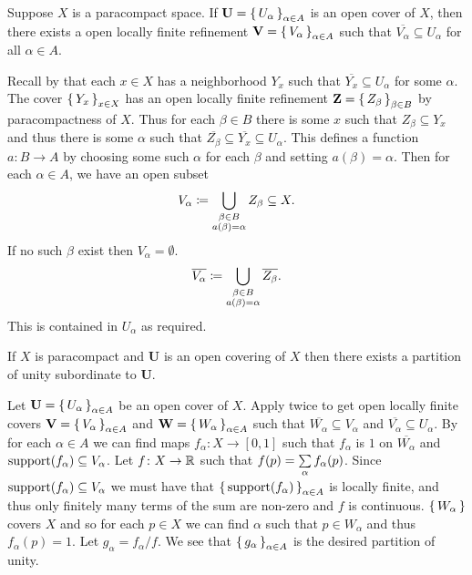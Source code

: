 \documentclass[letterpaper, 11pt, oneside]{book}
\begin{document}
\clearpage

\begin{lem}\label{lem: paracompact_refinement_closed_subset}
  Suppose $X$ is a paracompact space.
  If $\textbf{U} = \set{U_{\alpha}}_{\alpha \in A}$ is an open cover of $X$, then there exists a open locally finite refinement $\textbf{V} = \set{V_{\alpha}}_{\alpha \in A}$ such that $\overline{V_{\alpha}} \subseteq U_{\alpha}$ for all $\alpha \in A$.
\end{lem}
\begin{pf}
  Recall by  that each $x \in X$ has a neighborhood $Y_{x}$ such that $\overline{Y_{x}} \subseteq U_{\alpha}$ for some $\alpha$.
  The cover $\set{Y_{x}}_{x \in X}$ has an open locally finite refinement $\textbf{Z} = \set{Z_{\beta}}_{\beta \in B}$ by paracompactness of $X$.
  Thus for each $\beta \in B$ there is some $x$ such that $Z_{\beta} \subseteq Y_{x}$ and thus there is some $\alpha$ such that $\overline{Z_{\beta}} \subseteq \overline{Y_{x}} \subseteq U_{\alpha}$.
  This defines a function $a\colon B \to A$ by choosing some such $\alpha$ for each $\beta$ and setting $a(\beta) = \alpha$.
  Then for each $\alpha \in A$, we have an open subset
  \[
    V_{\alpha} \coloneqq \bigcup_{\substack{\beta \in B \\ a(\beta) = \alpha}} Z_{\beta} \subseteq X.
  \]
  If no such $\beta$ exist then $V_{\alpha} = \emptyset$.
  \[
    \overline{V_{\alpha}} \coloneqq \bigcup_{\substack{\beta \in B \\ a(\beta) = \alpha}} \overline{Z_{\beta}}.
  \]
  This is contained in $U_{\alpha}$ as required.
\end{pf}

\begin{thrm}
  If $X$ is paracompact and \textbf{U} is an open covering of $X$ then there exists a partition of unity subordinate to \textbf{U}.
\end{thrm}
\begin{pf}
  Let $\textbf{U} = \set{U_{\alpha}}_{\alpha \in A}$ be an open cover of $X$.
  Apply  twice to get open locally finite covers $\textbf{V} = \set{V_{\alpha}}_{\alpha \in A}$ and $\textbf{W} = \set{W_{\alpha}}_{\alpha \in A}$ such that $\overline{W_{\alpha}} \subseteq V_{\alpha}$ and $\overline{V_{\alpha}} \subseteq U_{\alpha}$.
  By  for each $\alpha \in A$ we can find maps $f_{\alpha}\colon X \to [0, 1]$ such that $f_{\alpha}$ is $1$ on $\overline{W_{\alpha}}$ and $\operatorname{support}(f_{\alpha}) \subseteq V_{\alpha}$.
  Let $f\colon X \to \mathbb{R}$ such that $f(p) = \sum\limits_{\alpha}f_{\alpha}(p)$.
  Since $\operatorname{support}(f_{\alpha}) \subseteq V_{\alpha}$ we must have that $\set{\operatorname{support}(f_{\alpha})}_{\alpha \in A}$ is locally finite, and thus only finitely many terms of the sum are non-zero and $f$ is continuous.
  $\set{W_{\alpha}}$ covers $X$ and so for each $p \in X$ we can find $\alpha$ such that $p \in W_{\alpha}$ and thus $f_{\alpha}(p) = 1$.
  Let $g_{\alpha} = f_{\alpha} / f$.
  We see that $\set{g_{\alpha}}_{\alpha \in A}$ is the desired partition of unity.
\end{pf}
\end{document}

